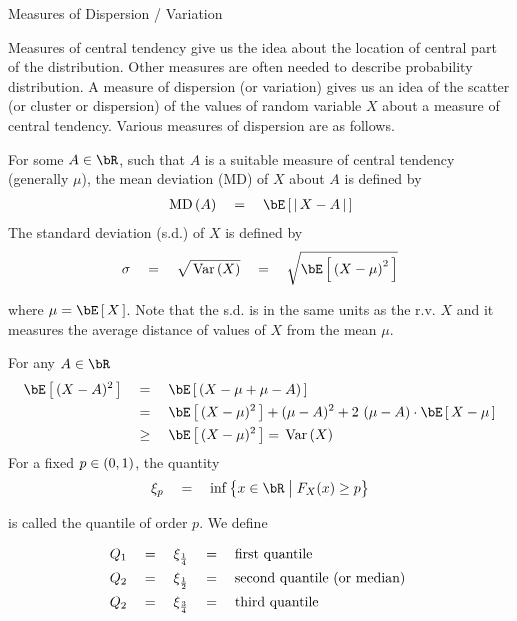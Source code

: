 \documentclass{article}
\begin{document}
\begin{ssection}{Measures of Dispersion / Variation}

	Measures of central tendency give us the idea about the location of central part of the distribution. Other measures are often needed to describe probability distribution. A measure of dispersion (or variation) gives us an idea of the scatter (or cluster or dispersion) of the values of random variable $X$ about a measure of central tendency. Various measures of dispersion are as follows.

	\begin{enumerate}[label=\bt{\theenumi.}]
		 For some $A \in \bR$, such that $A$ is a suitable measure of central tendency (generally $\mu$), the mean deviation (MD) of $X$ about $A$ is defined by
			\begin{align*}
				\tfunc{MD}{A}	\eq	\E{\abs{X - A}}
			\end{align*}
		 The standard deviation (s.d.) of $X$ is defined by
			\begin{align*}
				\sigma	\eq	\sqrt{\var{X}}	\eq	\sqrt{\E{\para{X - \mu}^2}}
			\end{align*}

			where $\mu = \E{X}$. Note that the s.d. is in the same units as the r.v. $X$ and it measures the average distance of values of $X$ from the mean $\mu$. \br

			For any $A \in \bR$
			\begin{align*}
				\E{(X - A)^2}	&\eq	\E{(X - \mu + \mu - A)} \\
								&\eq	\E{(X - \mu)^2} + (\mu - A)^2 + 2 \, \para{\mu - A} \cdot \E{X - \mu} \\
								&\qge	\E{(X - \mu)^2}	= \var{X}
			\end{align*}
		 For a fixed $p \in \left( {0, 1} \right)$, the quantity
			\begin{align*}
				\xi_p	\eq	\inf\set{x \in \bR \pipe F_X(x) \ge p}
			\end{align*}

			is called the quantile of order $p$. We define

			\begin{align*}
				Q_1	\quad = \quad	\xi_{\frac{1}{4}}	&\quad = \quad	\text{first quantile}\,\, \\
				Q_2	\quad = \quad	\xi_{\frac{1}{2}}	&\quad = \quad	\text{second quantile (or median)}\,\, \\
				Q_2	\quad = \quad	\xi_{\frac{3}{4}}	&\quad = \quad	\text{third quantile}\,\,
			\end{align*}


\end{enumerate}
\end{ssection}
\end{document}
